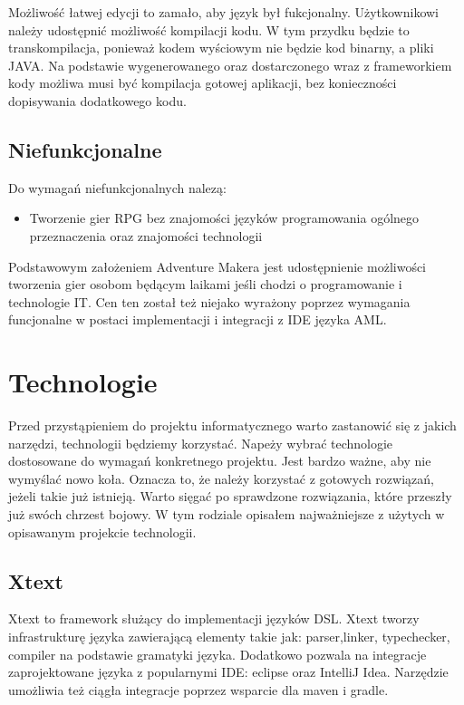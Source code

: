 \documentclass	{xmgr}
\begin{document}
Możliwość łatwej edycji to zamało, aby język był fukcjonalny. Użytkownikowi należy udostępnić możliwość kompilacji kodu. W tym przydku będzie to transkompilacja, ponieważ kodem wyściowym nie będzie kod binarny, a pliki JAVA. Na podstawie wygenerowanego oraz dostarczonego wraz z frameworkiem kody możliwa musi być kompilacja gotowej aplikacji, bez konieczności dopisywania dodatkowego kodu. 

\section{Niefunkcjonalne}
Do wymagań niefunkcjonalnych nalezą:
\begin{itemize}
	\item Tworzenie gier RPG bez znajomości języków programowania ogólnego przeznaczenia oraz znajomości technologii
\end{itemize}

Podstawowym założeniem Adventure Makera jest udostępnienie możliwości tworzenia gier osobom będącym laikami jeśli chodzi o programowanie i technologie IT. Cen ten został też niejako wyrażony poprzez wymagania funcjonalne w postaci implementacji i integracji z IDE języka AML.

\chapter{Technologie}
Przed przystąpieniem do projektu informatycznego warto zastanowić się z jakich narzędzi, technologii będziemy korzystać. Napeży wybrać technologie dostosowane do wymagań konkretnego projektu. Jest bardzo ważne, aby nie wymyślać nowo koła. Oznacza to, że należy korzystać z gotowych rozwiązań, jeżeli takie już istnieją. Warto sięgać po sprawdzone rozwiązania, które przeszły już swóch chrzest bojowy. W tym rodziale opisałem najważniejsze z użytych w opisawanym projekcie technologii.

\section{Xtext}

Xtext \cite{Xtext:2017:Doc} to framework służący do implementacji języków DSL. Xtext tworzy infrastrukturę języka zawierającą elementy takie jak: parser,linker, typechecker, compiler na podstawie gramatyki języka. Dodatkowo pozwala na integracje zaprojektowane języka z popularnymi IDE: eclipse oraz IntelliJ Idea. Narzędzie umożliwia też ciągła integracje poprzez wsparcie dla maven i gradle.
\end{document}
